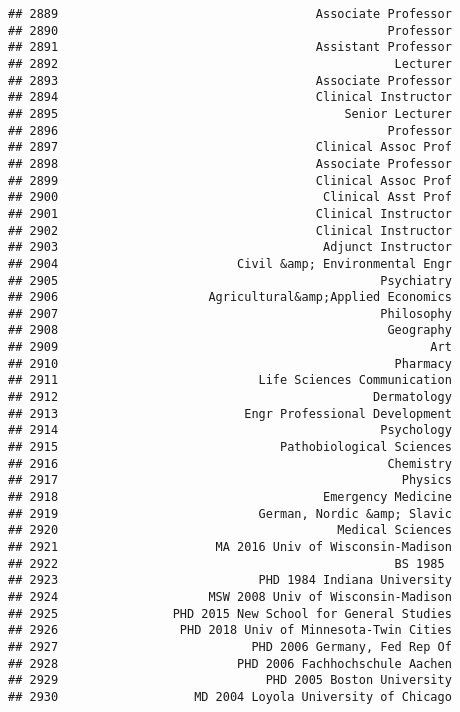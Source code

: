 \documentclass[
]{article}
\begin{document}
\begin{verbatim}
## 2889                                    Associate Professor
## 2890                                              Professor
## 2891                                    Assistant Professor
## 2892                                               Lecturer
## 2893                                    Associate Professor
## 2894                                    Clinical Instructor
## 2895                                        Senior Lecturer
## 2896                                              Professor
## 2897                                    Clinical Assoc Prof
## 2898                                    Associate Professor
## 2899                                    Clinical Assoc Prof
## 2900                                     Clinical Asst Prof
## 2901                                    Clinical Instructor
## 2902                                    Clinical Instructor
## 2903                                     Adjunct Instructor
## 2904                         Civil &amp; Environmental Engr
## 2905                                             Psychiatry
## 2906                     Agricultural&amp;Applied Economics
## 2907                                             Philosophy
## 2908                                              Geography
## 2909                                                    Art
## 2910                                               Pharmacy
## 2911                            Life Sciences Communication
## 2912                                            Dermatology
## 2913                          Engr Professional Development
## 2914                                             Psychology
## 2915                               Pathobiological Sciences
## 2916                                              Chemistry
## 2917                                                Physics
## 2918                                     Emergency Medicine
## 2919                            German, Nordic &amp; Slavic
## 2920                                       Medical Sciences
## 2921                      MA 2016 Univ of Wisconsin-Madison
## 2922                                               BS 1985 
## 2923                            PHD 1984 Indiana University
## 2924                     MSW 2008 Univ of Wisconsin-Madison
## 2925                PHD 2015 New School for General Studies
## 2926                 PHD 2018 Univ of Minnesota-Twin Cities
## 2927                           PHD 2006 Germany, Fed Rep Of
## 2928                         PHD 2006 Fachhochschule Aachen
## 2929                             PHD 2005 Boston University
## 2930                   MD 2004 Loyola University of Chicago

\end{verbatim}
\end{document}
